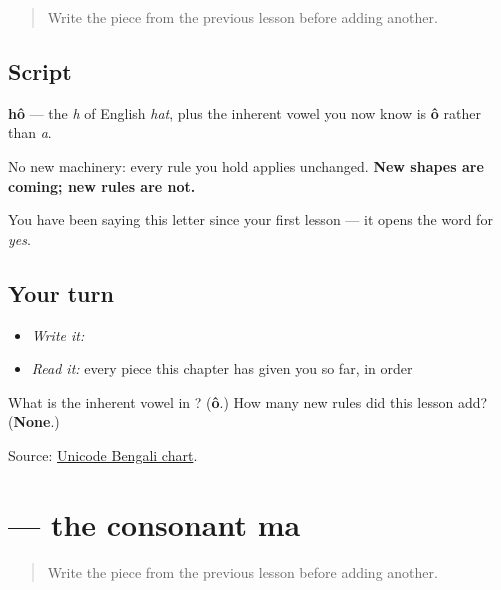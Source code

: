 \begin{quote}
Write the piece from the previous lesson before adding another.
\end{quote}

\subsection*{Script}

\begin{quote}
\end{quote}

\textbf{hô} — the \emph{h} of English \emph{hat}, plus the inherent vowel you now know is \textbf{ô} rather than \emph{a}.

No new machinery: every rule you hold applies unchanged. \textbf{New shapes are coming; new rules are not.}

You have been saying this letter since your first lesson — it opens the word for \emph{yes}.

\subsection*{Your turn}
\begin{itemize}
\raggedright
  \item \emph{Write it:} 
  \item \emph{Read it:} every piece this chapter has given you so far, in order
\end{itemize}

\begin{tcolorbox}[breakable,colback=teal!4,colframe=teal!35!black,title={Before you move on}]
What is the inherent vowel in \textbf{}? (\textbf{ô}.) How many new rules did this lesson add? (\textbf{None}.)

Source: \href{https://www.unicode.org/charts/PDF/U0980.pdf}{Unicode Bengali chart}.
\end{tcolorbox}
\section[\texorpdfstring{\bn{ম} (mô)}{ম (mô)}]{ — the consonant ma}

\label{lesson:BN-W01-ma}



\begin{quote}
Write the piece from the previous lesson before adding another.
\end{quote}

